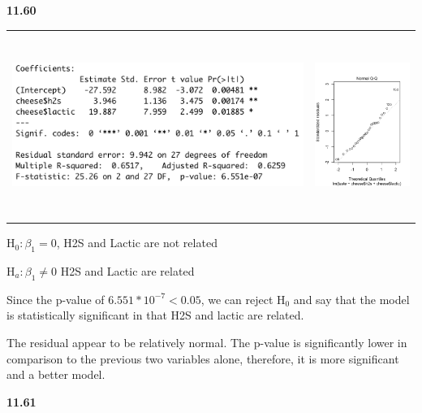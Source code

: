 \documentclass[12pt]{article}
\renewcommand\part[1]{\vspace{.10in}\textbf{#1}\par}
\begin{document}
\newpage
\part{11.60}

	\begin{center}
	\begin{tabular}{cc}
		\includegraphics[width=.5\textwidth, height=60mm, keepaspectratio]{images/1160/1160summary.png} & \includegraphics[width=.5\textwidth, height=60mm, keepaspectratio]{images/1160/QQplot.png}\\
	\end{tabular}
	\end{center}\par
	H$_{0}: \beta_{1} = 0$, H2S and Lactic are not related\par
	H$_{a}: \beta_{1} \ne 0$ H2S and Lactic are related\par
	Since the p-value of $6.551*10^{-7} < 0.05$, we can reject H$_{0}$ and say that the model is statistically significant in that H2S and lactic are related.\par
	The residual appear to be relatively normal. The p-value is significantly lower in comparison to the previous two variables alone, therefore, it is more significant and a better model.\par

\part{11.61}
\end{document}
